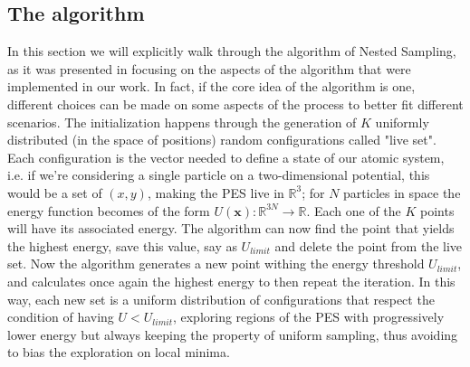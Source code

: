 \documentclass[a4paper, 12pt]{article}          %
\begin{document}
\subsection{The algorithm}
In this section we will explicitly walk through the algorithm of Nested Sampling, as it was presented in \cite{Partay2021NestedSampling} focusing on the aspects of the algorithm that were implemented in our work. In fact, if the core idea of the algorithm is one, different choices can be made on some aspects of the process to better fit different scenarios.
The initialization happens through the generation of $K$ uniformly distributed (in the space of positions) random configurations called "live set". Each configuration is the vector needed to define a state of our atomic system, i.e. if we're considering a single particle on a two-dimensional potential, this would be a set of $(x,y)$, making the PES live in $\mathbb{R}^3$; for $N$ particles in space the energy function becomes of the form $U(\mathbf{x}):\mathbb{R}^{3N}\rightarrow\mathbb{R}$. Each one of the $K$ points will have its associated energy. The algorithm can now find the point that yields the highest energy, save this value, say as $U_{limit}$ and delete the point from the live set. Now the algorithm generates a new point withing the energy threshold $U_{limit}$, and calculates once again the highest energy to then repeat the iteration. In this way, each new set is a uniform distribution of configurations that respect the condition of having $U<U_{limit}$, exploring regions of the PES with progressively lower energy but always keeping the property of uniform sampling, thus avoiding to bias the exploration on local minima. 
\end{document}
